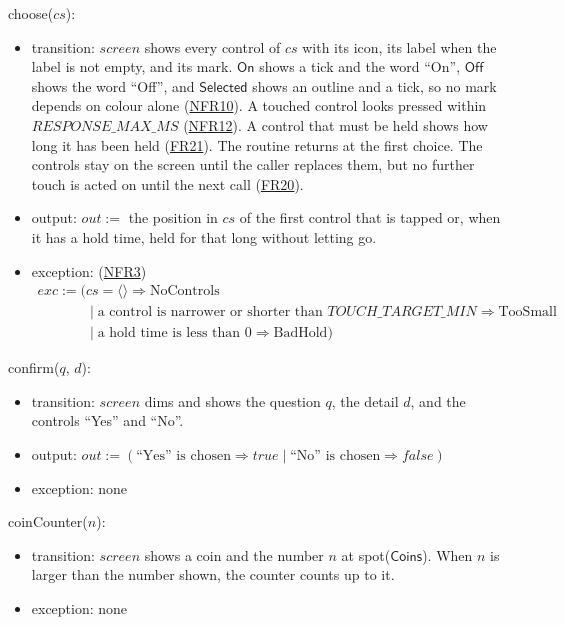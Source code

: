 \documentclass[10pt, titlepage]{article}
\newcommand{\srsurl}{https://team-hindsight.github.io/ophthamology-game/SRS/SRS.pdf}
\newcommand{\srsitemref}[2]{\href{\srsurl\#nameddest=#1}{#2}}
\newcommand{\T}[1]{\mathit{#1}}          %
\newcommand{\V}[1]{\mathsf{#1}}          %
\newcommand{\out}{\mathit{out}}
\newcommand{\exc}{\mathit{exc}}
\newcommand{\true}{\mathit{true}}
\newcommand{\false}{\mathit{false}}
\begin{document}
\noindent choose($\T{cs}$):
\begin{itemize}
\item transition: $\T{screen}$ shows every control of $\T{cs}$ with its icon,
  its label when the label is not empty, and its mark. $\V{On}$ shows a tick
  and the word ``On'', $\V{Off}$ shows the word ``Off'', and $\V{Selected}$
  shows an outline and a tick, so no mark depends on colour alone
  (\srsitemref{NFR_Colour}{NFR10}). A touched control looks pressed within
  $\T{RESPONSE\_MAX\_MS}$ (\srsitemref{NFR_Responsiveness}{NFR12}). A control
  that must be held shows how long it has been held
  (\srsitemref{FR_HoldSkip}{FR21}). The routine returns at the first choice.
  The controls stay on the screen until the caller replaces them, but no
  further touch is acted on until the next call
  (\srsitemref{FR_IgnoreRepeatedTouches}{FR20}).
\item output: $\out :=$ the position in $\T{cs}$ of the first control that is
  tapped or, when it has a hold time, held for that long without letting go.
\item exception: (\srsitemref{NFR_TouchTarget}{NFR3})
  \[\begin{array}{l}
  \exc := (\T{cs} = \langle\rangle \Rightarrow \text{NoControls}\\
  \phantom{\exc := (}\mid \text{a control is narrower or shorter than }
  \T{TOUCH\_TARGET\_MIN} \Rightarrow \text{TooSmall}\\
  \phantom{\exc := (}\mid \text{a hold time is less than 0} \Rightarrow
  \text{BadHold})
  \end{array}\]
\end{itemize}

\noindent confirm($q$, $d$):
\begin{itemize}
\item transition: $\T{screen}$ dims and shows the question $q$, the detail
  $d$, and the controls ``Yes'' and ``No''.
\item output: $\out := (\text{``Yes'' is chosen} \Rightarrow \true \mid
  \text{``No'' is chosen} \Rightarrow \false)$
\item exception: none
\end{itemize}

\noindent coinCounter($n$):
\begin{itemize}
\item transition: $\T{screen}$ shows a coin and the number $n$ at
  spot($\V{Coins}$). When $n$ is larger than the number shown, the counter
  counts up to it.
\item exception: none
\end{itemize}
\end{document}
